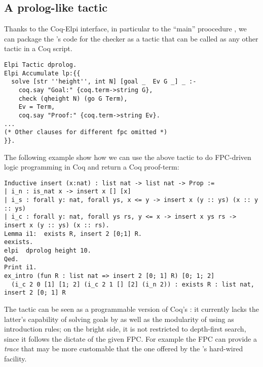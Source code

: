 

\subsection{A prolog-like tactic}


Thanks to the Coq-Elpi interface, in particular to the ``main''
proocedure , we can package the \lP's code for the checker
as a tactic that can be called as any other tactic in a Coq script.

\begin{lstlisting}
Elpi Tactic dprolog.
Elpi Accumulate lp:{{
  solve [str ''height'', int N] [goal _  Ev G _] _ :-
    coq.say "Goal:" {coq.term->string G},
    check (qheight N) (go G Term),
    Ev = Term,
    coq.say "Proof:" {coq.term->string Ev}.
...
(* Other clauses for different fpc omitted *)
}}.
\end{lstlisting}
The following example show how we can use the above tactic to do
FPC-driven logic programming in Coq and return a Coq proof-term:
\begin{lstlisting}
Inductive insert (x:nat) : list nat -> list nat -> Prop :=
| i_n : is_nat x -> insert x [] [x]
| i_s : forall y: nat, forall ys, x <= y -> insert x (y :: ys) (x :: y :: ys)
| i_c : forall y: nat, forall ys rs, y <= x -> insert x ys rs -> insert x (y :: ys) (x :: rs).
Lemma i1:  exists R, insert 2 [0;1] R.
eexists.
elpi  dprolog height 10.
Qed.
Print i1.
ex_intro (fun R : list nat => insert 2 [0; 1] R) [0; 1; 2]
  (i_c 2 0 [1] [1; 2] (i_c 2 1 [] [2] (i_n 2)) : exists R : list nat, insert 2 [0; 1] R
\end{lstlisting}

The  tactic can be seen as a programmable version of
Coq's : it currently lacks the latter's capability of
solving goals by  as well as the modularity of using
 as introduction rules; on the bright side, it is not
restricted to depth-first search, since it follows the dictate of the
given FPC. For example the FPC can provide a \emph{trace} that may be
more customable that the one offered by the 's hard-wired
 facility.
%


